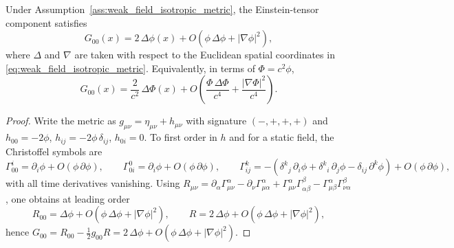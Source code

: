 \begin{theorem}
\label{thm:weak_field_G00_laplacian}
\MathTag Under Assumption~\ref{ass:weak_field_isotropic_metric}, the Einstein-tensor component satisfies
\begin{equation}
\label{eq:weak_field_G00_laplacian}
G_{00}(x)=2\,\Delta\phi(x)+O\!\left(\phi\,\Delta\phi+|\nabla\phi|^2\right),
\end{equation}
where $\Delta$ and $\nabla$ are taken with respect to the Euclidean spatial coordinates in \eqref{eq:weak_field_isotropic_metric}.
Equivalently, in terms of $\Phi=c^2\phi$,
\begin{equation}
\label{eq:weak_field_G00_laplacian_Phi}
G_{00}(x)=\frac{2}{c^2}\,\Delta\Phi(x)+O\!\left(\frac{\Phi\,\Delta\Phi}{c^4}+\frac{|\nabla\Phi|^2}{c^4}\right).
\end{equation}
\end{theorem}

\begin{proof}
Write the metric as $g_{\mu\nu}=\eta_{\mu\nu}+h_{\mu\nu}$ with signature $(-,+,+,+)$ and
$h_{00}=-2\phi$, $h_{ij}=-2\phi\,\delta_{ij}$, $h_{0i}=0$.
To first order in $h$ and for a static field, the Christoffel symbols are
\[
\Gamma^{i}_{00}=\partial_i\phi+O(\phi\,\partial\phi),
\qquad
\Gamma^{0}_{0i}=\partial_i\phi+O(\phi\,\partial\phi),
\qquad
\Gamma^{k}_{ij}=-(\delta^k{}_j\,\partial_i\phi+\delta^k{}_i\,\partial_j\phi-\delta_{ij}\,\partial^k\phi)+O(\phi\,\partial\phi),
\]
with all time derivatives vanishing.
Using $R_{\mu\nu}=\partial_\alpha\Gamma^\alpha_{\mu\nu}-\partial_\nu\Gamma^\alpha_{\mu\alpha}+\Gamma^\alpha_{\mu\nu}\Gamma^\beta_{\alpha\beta}-\Gamma^\alpha_{\mu\beta}\Gamma^\beta_{\nu\alpha}$,
one obtains at leading order
\[
R_{00}=\Delta\phi+O(\phi\,\Delta\phi+|\nabla\phi|^2),
\qquad
R=2\,\Delta\phi+O(\phi\,\Delta\phi+|\nabla\phi|^2),
\]
hence $G_{00}=R_{00}-\frac12 g_{00}R=2\,\Delta\phi+O(\phi\,\Delta\phi+|\nabla\phi|^2)$.
\end{proof}

